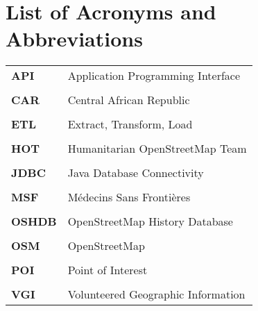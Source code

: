 \chapter*{List of Acronyms and Abbreviations}

\begin{table}[H]

\begin{tabular}{ll}
\textbf{API}   & Application Programming Interface   \\ \\
\textbf{CAR}   & Central African Republic            \\ \\
\textbf{ETL}   & Extract, Transform, Load            \\ \\
\textbf{HOT}   & Humanitarian OpenStreetMap Team     \\ \\
\textbf{JDBC}  & Java Database Connectivity          \\ \\
\textbf{MSF}   & Médecins Sans Frontières            \\ \\
\textbf{OSHDB} & OpenStreetMap History Database      \\ \\
\textbf{OSM}   & OpenStreetMap                       \\ \\
\textbf{POI}   & Point of Interest                   \\ \\
\textbf{VGI}   & Volunteered Geographic Information 
\end{tabular}
\end{table}



